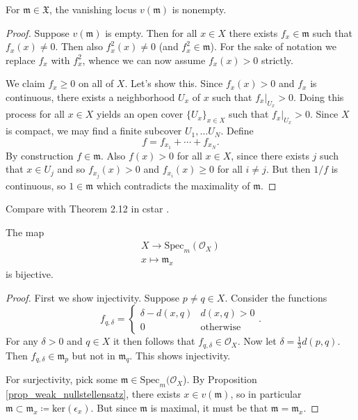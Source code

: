 \documentclass[12pt]{article}
\begin{document}
\begin{proposition}
\label{prop_weak_nullstellensatz}
	For $\mathfrak{m} \in \mathfrak{X}$, the vanishing locus $v(\mathfrak{m})$ is nonempty. 
\end{proposition}
\begin{proof}
	Suppose $v(\mathfrak{m})$ is empty. Then for all $x\in X$ there exists $f_x\in\mathfrak{m}$ such that $f_x(x)\neq 0$. Then also $f_x^2(x)\neq 0$ (and $f_x^2\in\mathfrak{m}$). For the sake of notation we replace $f_x$ with $f_x^2$, whence we can now assume $f_x(x) > 0$ strictly. 

	We claim $f_x\geq 0$ on all of $X$. Let's show this. Since $f_x(x)>0$ and $f_x$ is continuous, there exists a neighborhood $U_x$ of $x$ such that $f_x|_{U_x}>0$. Doing this process for all $x\in X$ yields an open cover $\{U_x\}_{x\in X}$ such that $f_x|_{U_x}>0$. Since $X$ is compact, we may find a finite subcover $U_1,\dots U_N$. Define 
	\begin{equation*}
		f = f_{x_1} + \cdots + f_{x_N}.
	\end{equation*}
	By construction $f\in\mathfrak{m}$.	Also $f(x)>0$ for all $x\in X$, since there exists $j$ such that $x\in U_j$ and so $f_{x_j}(x)>0$ and $f_{x_i}(x)\geq 0$ for all $i\neq j$. But then $1/f$ is continuous, so $1\in\mathfrak{m}$ which contradicts the maximality of $\mathfrak{m}$.
\end{proof}

\begin{remark}
	Compare with Theorem 2.12 in cstar .
\end{remark}

\begin{proposition}
\label{prop_x_specmOX_bijection}
	The map 
	\begin{gather*}
		X \longrightarrow \text{Spec}_m(\mathcal{O}_X) \\
		x \mapsto \mathfrak{m}_x
	\end{gather*}
	is bijective.
\end{proposition}
\begin{proof}
	First we show injectivity. Suppose $p\neq q\in X$. Consider the functions 
	\begin{equation*}
		f_{q,\delta} = 
		\begin{cases}
			\delta - d(x,q) & d(x,q) > 0 \\
			0 & \text{otherwise}
		\end{cases}.
	\end{equation*}
	For any $\delta>0$ and $q\in X$ it then follows that $f_{q,\delta}\in \mathcal{O}_X$. Now let $\delta = \frac{1}{3}d(p,q)$. Then $f_{q,\delta}\in\mathfrak{m}_p$ but not in $\mathfrak{m}_q$. This shows injectivity.

	For surjectivity, pick some $\mathfrak{m}\in\text{Spec}_m(\mathcal{O}_X$). By Proposition \ref{prop_weak_nullstellensatz}, there exists $x\in v(\mathfrak{m})$, so in particular $\mathfrak{m}\subset \mathfrak{m}_x\coloneqq \text{ker}(\epsilon_x)$. But since $\mathfrak{m}$ is maximal, it must be that $\mathfrak{m}=\mathfrak{m}_x$. 
\end{proof}
\end{document}
